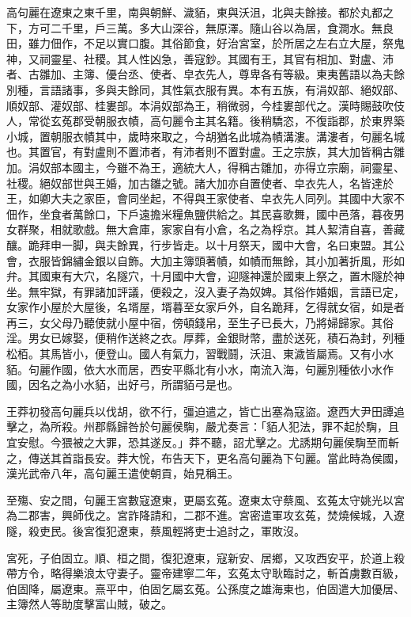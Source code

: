 
\begin{pinyinscope}
高句麗在遼東之東千里，南與朝鮮、濊貊，東與沃沮，北與夫餘接。都於丸都之下，方可二千里，戶三萬。多大山深谷，無原澤。隨山谷以為居，食澗水。無良田，雖力佃作，不足以實口腹。其俗節食，好治宮室，於所居之左右立大屋，祭鬼神，又祠靈星、社稷。其人性凶急，善寇鈔。其國有王，其官有相加、對盧、沛者、古雛加、主簿、優台丞、使者、皁衣先人，尊卑各有等級。東夷舊語以為夫餘別種，言語諸事，多與夫餘同，其性氣衣服有異。本有五族，有涓奴部、絕奴部、順奴部、灌奴部、桂婁部。本涓奴部為王，稍微弱，今桂婁部代之。漢時賜鼓吹伎人，常從玄菟郡受朝服衣幘，高句麗令主其名籍。後稍驕恣，不復詣郡，於東界築小城，置朝服衣幘其中，歲時來取之，今胡猶名此城為幘溝漊。溝漊者，句麗名城也。其置官，有對盧則不置沛者，有沛者則不置對盧。王之宗族，其大加皆稱古雛加。涓奴部本國主，今雖不為王，適統大人，得稱古雛加，亦得立宗廟，祠靈星、社稷。絕奴部世與王婚，加古雛之號。諸大加亦自置使者、皁衣先人，名皆達於王，如卿大夫之家臣，會同坐起，不得與王家使者、皁衣先人同列。其國中大家不佃作，坐食者萬餘口，下戶遠擔米糧魚鹽供給之。其民喜歌舞，國中邑落，暮夜男女群聚，相就歌戲。無大倉庫，家家自有小倉，名之為桴京。其人絜清自喜，善藏釀。跪拜申一脚，與夫餘異，行步皆走。以十月祭天，國中大會，名曰東盟。其公會，衣服皆錦繡金銀以自飾。大加主簿頭著幘，如幘而無餘，其小加著折風，形如弁。其國東有大穴，名隧穴，十月國中大會，迎隧神還於國東上祭之，置木隧於神坐。無牢獄，有罪諸加評議，便殺之，沒入妻子為奴婢。其俗作婚姻，言語已定，女家作小屋於大屋後，名壻屋，壻暮至女家戶外，自名跪拜，乞得就女宿，如是者再三，女父母乃聽使就小屋中宿，傍頓錢帛，至生子已長大，乃將婦歸家。其俗淫。男女已嫁娶，便稍作送終之衣。厚葬，金銀財幣，盡於送死，積石為封，列種松栢。其馬皆小，便登山。國人有氣力，習戰鬪，沃沮、東濊皆屬焉。又有小水貊。句麗作國，依大水而居，西安平縣北有小水，南流入海，句麗別種依小水作國，因名之為小水貊，出好弓，所謂貊弓是也。

王莽初發高句麗兵以伐胡，欲不行，彊迫遣之，皆亡出塞為寇盜。遼西大尹田譚追擊之，為所殺。州郡縣歸咎於句麗侯騊，嚴尤奏言：「貊人犯法，罪不起於騊，且宜安慰。今猥被之大罪，恐其遂反。」莽不聽，詔尤擊之。尤誘期句麗侯騊至而斬之，傳送其首詣長安。莽大恱，布告天下，更名高句麗為下句麗。當此時為侯國，漢光武帝八年，高句麗王遣使朝貢，始見稱王。

至殤、安之間，句麗王宮數寇遼東，更屬玄菟。遼東太守蔡風、玄菟太守姚光以宮為二郡害，興師伐之。宮詐降請和，二郡不進。宮密遣軍攻玄菟，焚燒候城，入遼隧，殺吏民。後宮復犯遼東，蔡風輕將吏士追討之，軍敗沒。

宮死，子伯固立。順、桓之間，復犯遼東，寇新安、居鄉，又攻西安平，於道上殺帶方令，略得樂浪太守妻子。靈帝建寧二年，玄菟太守耿臨討之，斬首虜數百級，伯固降，屬遼東。熹平中，伯固乞屬玄菟。公孫度之雄海東也，伯固遣大加優居、主簿然人等助度擊富山賊，破之。


\end{pinyinscope}
